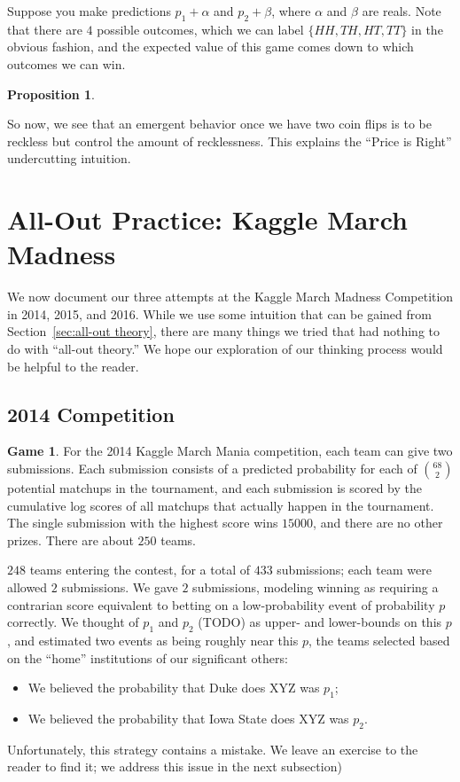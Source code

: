 \documentclass[12pt,twoside,singlespace]{article}
\numberwithin{equation}{section}
\newtheorem{prop}[equation]{Proposition}
\theoremstyle{definition}
\newtheorem{game}{Game}
\begin{document}
Suppose you make predictions $p_1 + \alpha$ and $p_2 + \beta$, where $\alpha$ and $\beta$ are reals. Note that there are $4$ possible outcomes, which we can label $\{HH, TH, HT, TT\}$ in the obvious fashion, and the expected value of this game comes down to which outcomes we can win.

\begin{prop}

\end{prop}

So now, we see that an emergent behavior once we have two coin flips is to be reckless but control the amount of recklessness. This explains the ``Price is Right'' undercutting intuition.


\section{All-Out Practice: Kaggle March Madness}
\label{sec:practice}

We now document our three attempts at the Kaggle March Madness Competition in 2014, 2015, and 2016. While we use some intuition that can be gained from Section~\ref{sec:all-out theory}, there are many things we tried that had nothing to do with ``all-out theory.'' We hope our exploration of our thinking process would be helpful to the reader.

\subsection{2014 Competition}

\begin{game}
\label{game:mm}
For the 2014 Kaggle March Mania competition, each team can give two submissions. Each submission consists of a predicted probability for each of ${68 \choose 2}$ potential matchups in the tournament, and each submission is scored by the cumulative log scores of all matchups that actually happen in the tournament. The single submission with the highest score wins $15000$, and there are no other prizes. There are about $250$ teams. 
\end{game}

$248$ teams entering the contest, for a total of $433$ submissions; each team were allowed $2$ submissions. We gave $2$ submissions, modeling winning as requiring a contrarian score equivalent to betting on a low-probability event of probability $p$ correctly. We thought of $p_1$ and $p_2$ (TODO) as upper- and lower-bounds on this $p$, and estimated two events as being roughly near this $p$, the teams selected based on the ``home'' institutions of our significant others:
\begin{itemize}
\item We believed the probability that Duke does XYZ was $p_1$;
\item We believed the probability that Iowa State does XYZ was $p_2$.
\end{itemize}
Unfortunately, this strategy contains a mistake. We leave an exercise to the reader to find it; we address this issue in the next subsection)
\end{document}
